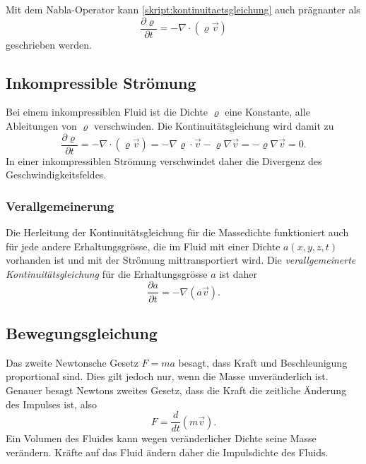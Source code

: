 %
Mit dem Nabla-Operator kann
\eqref{skript:kontinuitaetsgleichung}
auch prägnanter als
\begin{equation}
\frac{\partial \varrho}{\partial t}
=
-\nabla\cdot (\varrho\vec{v})
\label{skript:hydro:kontvekt}
\end{equation}
geschrieben werden.

\subsection{Inkompressible Strömung}
Bei einem inkompressiblen Fluid ist die Dichte $\varrho$ eine Konstante, alle
Ableitungen von $\varrho$ verschwinden.
Die Kontinuitätsgleichung wird damit zu
\[
\frac{\partial\varrho}{\partial t}
=
-\nabla\cdot(\varrho\vec{v})
=
-\nabla\varrho\cdot\vec{v}
-\varrho\nabla\vec{v}
=
-\varrho\nabla\vec{v}
=
0.
\]
In einer inkompressiblen Strömung verschwindet daher die Divergenz
des Geschwindigkeitsfeldes.

\subsubsection{Verallgemeinerung}
Die Herleitung der Kontinuitätsgleichung für die Massedichte funktioniert
auch für jede andere Erhaltungsgrösse, die im Fluid mit einer Dichte
$a(x,y,z,t)$ vorhanden ist und mit der Strömung mittransportiert wird.
Die {\em verallgemeinerte Kontinuitätsgleichung} für die Erhaltungsgrösse $a$
ist daher
\begin{equation}
\frac{\partial a}{\partial t}
=
-
\nabla(a\vec{v}).
\label{skript:verallgemeinerte kontinuitaetsgleichung}
\end{equation}

\subsection{Bewegungsgleichung}
Das zweite Newtonsche Gesetz $F=ma$ besagt, dass Kraft und Beschleunigung
proportional sind.
Dies gilt jedoch nur, wenn die Masse unveränderlich ist.
Genauer besagt Newtons zweites Gesetz, dass die Kraft die
zeitliche Änderung des Impulses ist, also
\[
F=
\frac{d}{dt}(m\vec v).
\]
Ein Volumen des Fluides kann wegen veränderlicher Dichte seine
Masse verändern.
Kräfte auf das Fluid ändern daher die Impulsdichte des Fluids.

